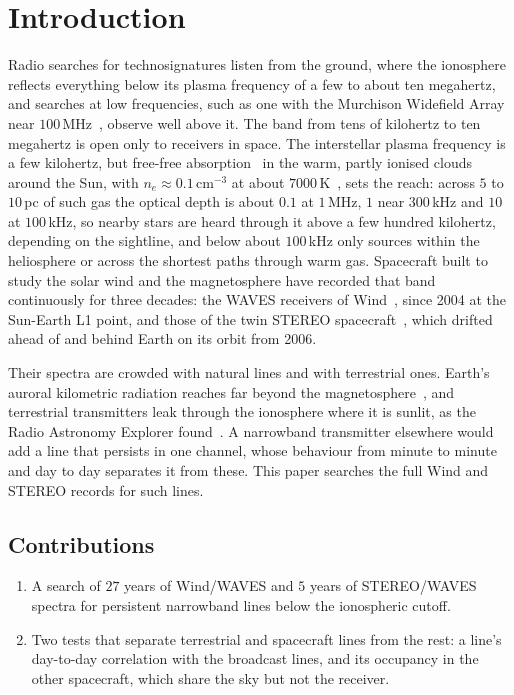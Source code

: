 \documentclass[3p,11pt]{elsarticle}
\begin{document}
\section{Introduction}\label{sec:intro}

Radio searches for technosignatures listen from the ground, where the ionosphere
reflects everything below its plasma frequency of a few to about ten megahertz, and
searches at low frequencies, such as one with the Murchison Widefield Array near
$100$\,MHz~\cite{Tingay2016}, observe well above it. The band from tens
of kilohertz to ten megahertz is open only to receivers in space. The interstellar plasma
frequency is a few kilohertz, but free-free absorption~\cite{RybickiLightman1979} in the
warm, partly ionised clouds around the Sun, with $n_e \approx 0.1$\,cm$^{-3}$ at about
$7000$\,K~\cite{RedfieldLinsky2008}, sets the reach: across $5$ to $10$\,pc of such gas
the optical depth is about $0.1$ at $1$\,MHz, $1$ near $300$\,kHz and $10$ at $100$\,kHz,
so nearby stars are heard through it above a few hundred kilohertz, depending on the
sightline, and below about $100$\,kHz only sources within the heliosphere or across the
shortest paths through warm gas. Spacecraft built to study the solar wind and the
magnetosphere have recorded that band continuously for three decades: the WAVES
receivers of Wind~\cite{Bougeret1995}, since 2004 at the Sun-Earth L1 point, and those of
the twin STEREO spacecraft~\cite{Bougeret2008}, which drifted ahead of and behind Earth
on its orbit from 2006.

Their spectra are crowded with natural lines and with terrestrial ones. Earth's auroral
kilometric radiation reaches far beyond the magnetosphere~\cite{Gurnett1974}, and
terrestrial transmitters leak through the ionosphere where it is sunlit, as the Radio
Astronomy Explorer found~\cite{Herman1973}. A narrowband transmitter elsewhere would
add a line that persists in one channel, whose behaviour from minute to minute and day to
day separates it from these. This paper searches the full Wind and STEREO records for
such lines.

\subsection{Contributions}
\begin{enumerate}[leftmargin=*,itemsep=1pt]
\item A search of $27$ years of Wind/WAVES and $5$ years of STEREO/WAVES spectra for
persistent narrowband lines below the ionospheric cutoff.
\item Two tests that separate terrestrial and spacecraft lines from the rest: a line's
day-to-day correlation with the broadcast lines, and its occupancy in the other
spacecraft, which share the sky but not the receiver.
\end{enumerate}
\end{document}
